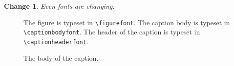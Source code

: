 \documentclass[%
]{journal}
\begin{document}
\newtheorem{change}{Change}

\begin{change}
  Even fonts are changing.
\end{change}


\begin{figure}[htbp]
  \begin{center}
    \leavevmode
    The figure is typeset in \verb|\figurefont|.
    The caption body is typeset in \verb|\captionbodyfont|.
    The header of the caption is typeset in \verb|\captionheaderfont|.
  \end{center}
  \caption{The body of the caption.}
\end{figure}




\end{document}
